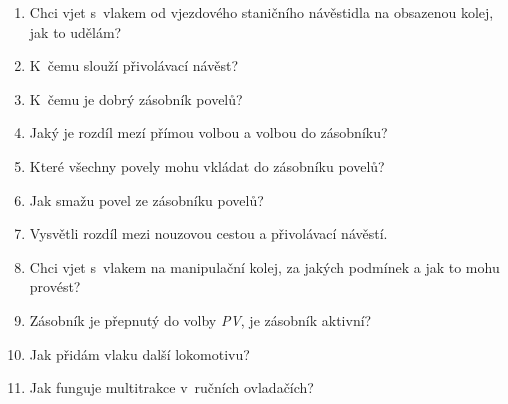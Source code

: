 \documentclass[12pt,a4paper]{article}
\begin{document}
\begin{enumerate}[leftmargin=*]
\item Chci vjet s~vlakem od vjezdového staničního návěstidla na obsazenou
kolej, jak to udělám?

\item K~čemu slouží přivolávací návěst?

\item K~čemu je dobrý zásobník povelů?

\item Jaký je rozdíl mezí přímou volbou a volbou do zásobníku?

\item Které všechny povely mohu vkládat do zásobníku povelů?

\item Jak smažu povel ze zásobníku povelů?

\item Vysvětli rozdíl mezi nouzovou cestou a přivolávací návěstí.

\item Chci vjet s~vlakem na manipulační kolej, za jakých podmínek a jak to mohu
provést?

\item Zásobník je přepnutý do volby \textit{PV}, je zásobník aktivní?

\item Jak přidám vlaku další lokomotivu?

\item Jak funguje multitrakce v~ručních ovladačích?

\end{enumerate}
\end{document}
